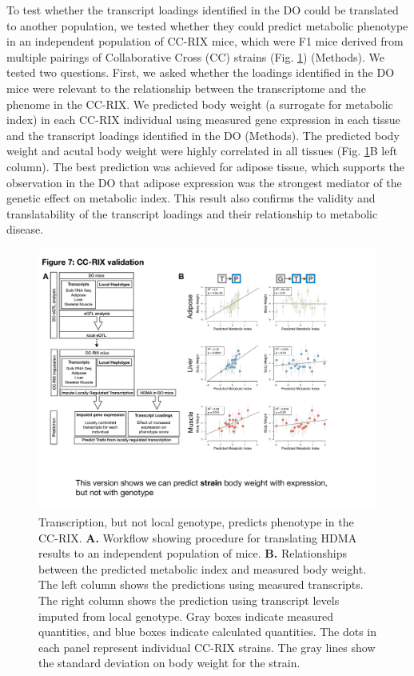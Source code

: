\documentclass[
]{article}
\begin{document}
To test whether the transcript loadings identified in the DO could be
translated to another population, we tested whether they could predict
metabolic phenotype in an independent population of CC-RIX mice, which
were F1 mice derived from multiple pairings of Collaborative Cross (CC)
\cite{pmid28592495, pmid21411855, 
pmid17674098, pmid15514660} strains (Fig. \ref{fig:cc_prediction})
(Methods). We tested two questions. First, we asked whether the loadings
identified in the DO mice were relevant to the relationship between the
transcriptome and the phenome in the CC-RIX. We predicted body weight (a
surrogate for metabolic index) in each CC-RIX individual using measured
gene expression in each tissue and the transcript loadings identified in
the DO (Methods). The predicted body weight and acutal body weight were
highly correlated in all tissues (Fig. \ref{fig:cc_prediction}B left
column). The best prediction was achieved for adipose tissue, which
supports the observation in the DO that adipose expression was the
strongest mediator of the genetic effect on metabolic index. This result
also confirms the validity and translatability of the transcript
loadings and their relationship to metabolic disease.

\begin{figure}[ht!]
\includegraphics[width=\textwidth]{Figures/Fig7_CC_Prediction.pdf} 
\caption{Transcription, but not local genotype, predicts 
phenotype in the CC-RIX. \textbf{A.} Workflow showing procedure 
for translating HDMA results to an independent population of mice. 
\textbf{B.} Relationships between the predicted metabolic index 
and measured body weight. The left column shows the predictions 
using measured transcripts. The right column shows the prediction 
using transcript levels imputed from local genotype. Gray boxes 
indicate measured quantities, and blue boxes indicate calculated 
quantities. The dots in each panel represent individual CC-RIX strains. 
The gray lines show the standard deviation on body weight for the strain.
}
\label{fig:cc_prediction}
\end{figure}
\end{document}
